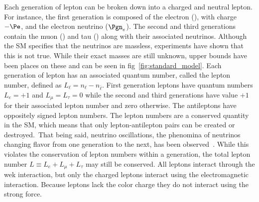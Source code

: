 Each generation of lepton can be broken down into a charged and neutral lepton.
For instance, the first generation is composed of the electron (\Pe), with charge $-\Pe$, and the electron neutrino ($\Pgn_{e}$).
The second and third generations contain the muon (\Pmu) and tau (\Ptau) along with their associated neutrinos.
Although the SM specifies that the neutrinos are massless, experiments have shown that this is not true.
While their exact masses are still unknown, upper bounds have been places on these and can be seen in fig~\ref{fig:standard_model}.
Each generation of lepton has an associated quantum number, called the lepton number, defined as $L_{\ell}=n_{\ell}-n_{\bar{\ell}}$.
First generation leptons have quantum numbers $L_{e}=+1$ and $L_{\mu}=L_{\tau}=0$ while the second and third generations have value $+1$ for their associated lepton number and zero otherwise.
The antileptons have oppositely signed lepton numbers.
The lepton numbers are a conserved quantity in the SM, which means that only lepton-antilepton pairs can be created or destroyed.\
That being said, neutrino oscillations, the phenomina of neutrinos changing flavor from one generation to the next, has been observed~\cite{Maltoni:2004ei}.
While this violates the conservation of lepton numbers within a generation, the total lepton number $L{\equiv}L_{e}+L_{\mu}+L_{\tau}$ may still be conserved.
All leptons interact through the wek interaction, but only the charged leptons interact using the electromagnetic interaction.
Because leptons lack the color charge they do not interact using the strong force.


